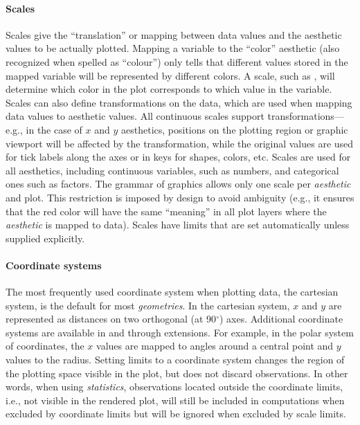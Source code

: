 \documentclass[krantz2]{krantz}\usepackage{knitr}
\begin{document}
\paragraph{Scales}
Scales give the ``translation'' or mapping between data values and the aesthetic values to be actually plotted. Mapping a variable to the ``color'' aesthetic (also recognized when spelled as ``colour'') only tells that different values stored in the mapped variable will be represented by different colors. A scale, such as , will determine which color in the plot corresponds to which value in the variable. Scales can also define transformations on the data, which are used when mapping data values to aesthetic values. All continuous scales support transformations---e.g., in the case of $x$ and $y$ aesthetics, positions on the plotting region or graphic viewport will be affected by the transformation, while the original values are used for tick labels along the axes or in keys for shapes, colors, etc. Scales are used for all aesthetics, including continuous variables, such as numbers, and categorical ones such as factors. The grammar of graphics allows only one scale per \emph{aesthetic} and plot. This restriction is imposed by design to avoid ambiguity (e.g., it ensures that the red color will have the same ``meaning'' in all plot layers where the  \emph{aesthetic} is mapped to data). Scales have limits that are set automatically unless supplied explicitly.

\paragraph{Coordinate systems}
The most frequently used coordinate system when plotting data, the cartesian system, is the default for most \emph{geometries}. In the cartesian system, $x$ and $y$ are represented as distances on two orthogonal (at 90$^\circ$) axes. Additional coordinate systems are available in  and through extensions. For example, in the polar system of coordinates, the $x$ values are mapped to angles around a central point and $y$ values to the radius. Setting limits to a coordinate system changes the region of the plotting space visible in the plot, but does not discard observations. In other words, when using \emph{statistics}, observations located outside the coordinate limits, i.e., not visible in the rendered plot, will still be included in computations when excluded by coordinate limits but will be ignored when excluded by scale limits.
\end{document}
